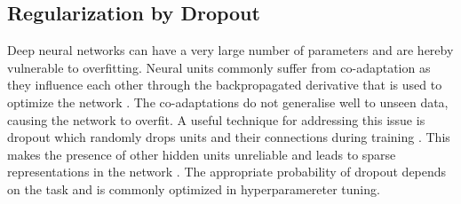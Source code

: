 \documentclass[bsc,frontabs,twoside,singlespacing,parskip,deptreport]{infthesis}     %
\let\Oldsubsection\subsection
\renewcommand{\subsection}{\FloatBarrier\Oldsubsection}
\begin{document}
  



\subsection{Regularization by Dropout}
Deep neural networks can have a very large number of parameters and are hereby vulnerable to overfitting. Neural units commonly suffer from co-adaptation as they influence each other through the backpropagated derivative that is used to optimize the network \cite{srivastava_dropout_2014}. The co-adaptations do not generalise well to unseen data, causing the network to overfit. A useful technique for addressing this issue is dropout which randomly drops units and their connections during training \cite{srivastava_dropout_2014}. This makes the presence of other hidden units unreliable and  leads to sparse representations in the network \cite{srivastava_dropout_2014}. The appropriate probability of dropout depends on the task and is commonly optimized in hyperparamereter tuning.
\end{document}
